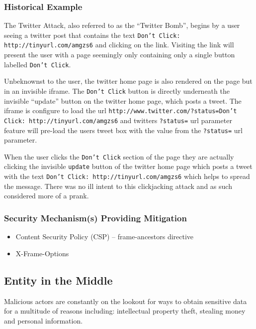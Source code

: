 \documentclass{mscreport}
\begin{document}
\subsubsection{Historical Example}
The Twitter Attack, also referred to as the ``Twitter Bomb'', begins by a user seeing a twitter post that contains the text \texttt{Don't Click: http://tinyurl.com/amgzs6} \cite{Jani2015-kw} and clicking on the link. Visiting the link will present the user with a page seemingly only containing only a single button labelled \texttt{Don't Click}.

\vspace{0.3cm} \noindent
Unbeknownst to the user, the twitter home page is also rendered on the page but in an invisible iframe. The \texttt{Don't Click} button is directly underneath the invisible ``update'' button on the twitter home page, which posts a tweet. The iframe is configure to load the url \texttt{http://www.twitter.com/?status=Don't Click: http://tinyurl.com/amgzs6} \cite{Jani2015-kw} and twitters \texttt{?status=} url parameter feature will pre-load the users tweet box with the value from the \texttt{?status=} url parameter.

\vspace{0.3cm} \noindent
When the user clicks the \texttt{Don't Click} section of the page they are actually clicking the invisible \texttt{update} button of the twitter home page which posts a tweet with the text \texttt{Don’t Click: http://tinyurl.com/amgzs6} \cite{Jani2015-kw} which helps to spread the message. There was no ill intent to this clickjacking attack and as such considered more of a prank.
\subsubsection{Security Mechanism(s) Providing Mitigation}

\begin{itemize}
	\setlength\itemsep{0.1em}
	\item Content Security Policy (CSP) – frame-ancestors directive
	\item X-Frame-Options
\end{itemize}

\subsection{Entity in the Middle}
\label{subsection:entity_in_the_middle}

Malicious actors are constantly on the lookout for ways to obtain sensitive data for a multitude of reasons including: intellectual property theft, stealing money and personal information.
\end{document}
